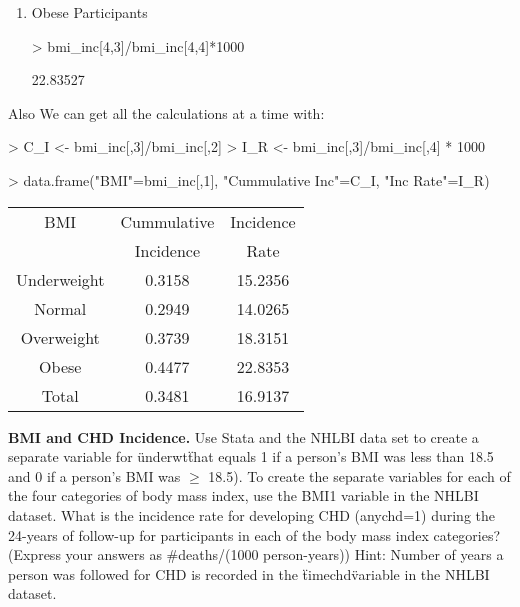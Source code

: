 \documentclass{article}
\begin{document}
\begin{enumerate}
\begin{enumerate}
\item Obese Participants
\begin{Schunk}
\begin{Sinput}
> bmi_inc[4,3]/bmi_inc[4,4]*1000
\end{Sinput}
\begin{Soutput}
[1] 22.83527
\end{Soutput}
\end{Schunk}
\end{enumerate}
 
\end{enumerate}

\pagebreak
Also We can get all the calculations at a time with:

\begin{Schunk}
\begin{Sinput}
> C_I <- bmi_inc[,3]/bmi_inc[,2]
> I_R <- bmi_inc[,3]/bmi_inc[,4] * 1000
\end{Sinput}
\end{Schunk}

\begin{Schunk}
\begin{Sinput}
> data.frame("BMI"=bmi_inc[,1], "Cummulative Inc"=C_I, "Inc Rate"=I_R)
\end{Sinput}
\end{Schunk}

\begin{table}[ht]
\begin{center}
\begin{tabular}{ccc}
  \hline
BMI & Cummulative & Incidence \\
& Incidence & Rate \\
\hline
Underweight & 0.3158 & 15.2356 \\ 
Normal & 0.2949 & 14.0265 \\ 
Overweight & 0.3739 & 18.3151 \\ 
Obese & 0.4477 & 22.8353 \\ 
\hline
Total & 0.3481 & 16.9137 \\ 
\end{tabular}
\end{center}
\end{table}

\pagebreak

\textbf{BMI and CHD Incidence.} Use Stata and the NHLBI data set to create a separate variable for \"underwt\" that equals 1 if a person's BMI was less than 18.5 and 0 if a person's BMI was \(\geq \) 18.5). To create the separate variables for each of the four categories of body mass index, use the BMI1 variable in the NHLBI dataset.  What is the incidence rate for developing CHD (anychd=1) during the 24-years of follow-up for participants in each of the body mass index categories? (Express your answers as #deaths/(1000 person-years))  Hint: Number of years a person was followed for CHD is recorded in the \"timechd\" variable in the NHLBI dataset.
\end{document}
